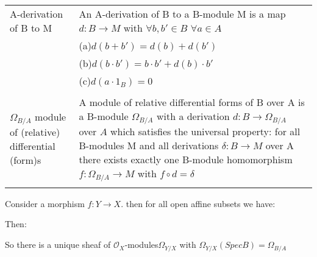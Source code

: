 \documentclass[a4paper, 12pt]{article}
\newcommand{\oxmods}{$\mathcal{O}_X$-modules}
\begin{document}
\begin{tabular}{p{4cm} p{11cm}}


	A-derivation of B to M & An A-derivation of B to a B-module M is a map $d:B\longrightarrow M$ with $\forall b,b'\in B$ $\forall a  \in A$\\
	&(a)$d(b+b')=d(b)+d(b')$\\
	&(b)$d(b\cdot b')= b\cdot b' + d(b)\cdot b'$\\
	&(c)$d(a\cdot 1_B)= 0$\\
	
	
	&\\
	
	$\Omega_{B/A}$ module of (relative) differential (form)s & A module of relative differential forms of B over A is a B-module $\Omega_{B/A}$ with a derivation $d:B \longrightarrow \Omega_{B/A}$ over $A$ which satisfies the universal property: for all B-modules M and all derivations $\delta : B \longrightarrow M$ over A there exists exactly one B-module homomorphism $f: \Omega_{B/A} \longrightarrow M $ with $f \circ d = \delta $ \\
	
	&\\
\end{tabular}


Consider a morphism $f:Y \longrightarrow X$. then for all open affine subsets we have:



\begin{center}


 	
\end{center}

Then: 
%
%

So there is a unique sheaf of \oxmods $\Omega_{Y/X}$ with $\Omega_{Y/X}(Spec B) = \Omega_{B/A}$
\end{document}
